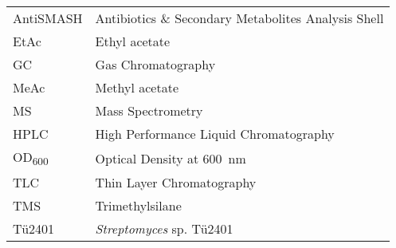 
\begin{table}[htbp]
	\centering
	\begin{tabularx}{\textwidth}{>{\hsize=0.25\hsize}X>{\hsize=0.75\hsize}X}
		\toprule
		AntiSMASH	& Antibiotics \& Secondary Metabolites Analysis Shell	\\
		EtAc		& Ethyl acetate			\\
		GC			& Gas Chromatography	\\
		MeAc		& Methyl acetate		\\
		MS			& Mass Spectrometry		\\
		HPLC		& High Performance Liquid Chromatography		\\
		OD\textsubscript{600}	& Optical Density at \SI{600}{\nano\meter}	\\
		TLC			& Thin Layer Chromatography 	\\
		TMS 		& Trimethylsilane		\\
		Tü2401		& \textit{Streptomyces} sp. Tü2401		\\
		
		
		\bottomrule
	\end{tabularx}
\end{table}
